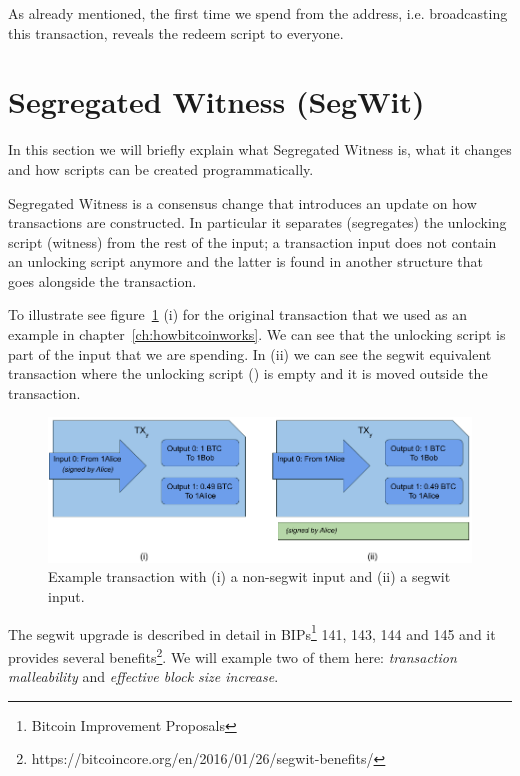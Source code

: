 \begin{note}
As already mentioned, the first time we spend from the address, i.e. broadcasting this transaction, reveals the redeem script to everyone.
\end{note}



\section{Segregated Witness (SegWit)}
\label{sec:segwit}

In this section we will briefly explain what Segregated Witness is, what it changes and how scripts can be created programmatically. 

Segregated Witness is a consensus change that introduces an update on how transactions are constructed. In particular it separates (segregates) the unlocking script (witness) from the rest of the input; a transaction input does not contain an unlocking script anymore and the latter is found in another structure that goes alongside the transaction. 

To illustrate see figure~\ref{fig:tx-with-without-segwit} (i) for the original transaction that we used as an example in chapter~\ref{ch:howbitcoinworks}. We can see that the unlocking script is part of the input that we are spending. In (ii) we can see the segwit equivalent transaction where the unlocking script () is empty and it is moved outside the transaction.

\begin{figure}[H]
\begin{center}
\includegraphics[scale=0.5]{images/tx-with-without-segwit}
\caption{Example transaction with (i) a non-segwit input and (ii) a segwit input.}
\label{fig:tx-with-without-segwit}
\end{center}
\end{figure}

The segwit upgrade is described in detail in BIPs\footnote{Bitcoin Improvement Proposals} 141, 143, 144 and 145 and it provides several benefits\footnote{https://bitcoincore.org/en/2016/01/26/segwit-benefits/}. We will example two of them here: \emph{transaction malleability} and \emph{effective block size increase}.

